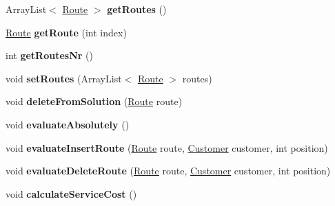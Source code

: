 \begin{DoxyCompactItemize}
\item 
Array\+List$<$ \hyperlink{classsvrptw_1_1_route}{Route} $>$ {\bfseries get\+Routes} ()\hypertarget{classtabu_1_1_my_solution_a0d53ac6bd5d5acbff1c2fcec609fd5a6}{}\label{classtabu_1_1_my_solution_a0d53ac6bd5d5acbff1c2fcec609fd5a6}

\item 
\hyperlink{classsvrptw_1_1_route}{Route} {\bfseries get\+Route} (int index)\hypertarget{classtabu_1_1_my_solution_a8f78485a9b2422bd9f00bbd20f86a20c}{}\label{classtabu_1_1_my_solution_a8f78485a9b2422bd9f00bbd20f86a20c}

\item 
int {\bfseries get\+Routes\+Nr} ()\hypertarget{classtabu_1_1_my_solution_a0c0a2401903315916b8db0d7baeed128}{}\label{classtabu_1_1_my_solution_a0c0a2401903315916b8db0d7baeed128}

\item 
void {\bfseries set\+Routes} (Array\+List$<$ \hyperlink{classsvrptw_1_1_route}{Route} $>$ routes)\hypertarget{classtabu_1_1_my_solution_a30cbab93efd82aa222a23b1bc3b0bb46}{}\label{classtabu_1_1_my_solution_a30cbab93efd82aa222a23b1bc3b0bb46}

\item 
void {\bfseries delete\+From\+Solution} (\hyperlink{classsvrptw_1_1_route}{Route} route)\hypertarget{classtabu_1_1_my_solution_a67ae75ddf98d5442f1a9168b761ef4e6}{}\label{classtabu_1_1_my_solution_a67ae75ddf98d5442f1a9168b761ef4e6}

\item 
void {\bfseries evaluate\+Absolutely} ()\hypertarget{classtabu_1_1_my_solution_a4cb6ce84091aeca2f5abd2b3bd3a3a17}{}\label{classtabu_1_1_my_solution_a4cb6ce84091aeca2f5abd2b3bd3a3a17}

\item 
void {\bfseries evaluate\+Insert\+Route} (\hyperlink{classsvrptw_1_1_route}{Route} route, \hyperlink{classsvrptw_1_1_customer}{Customer} customer, int position)\hypertarget{classtabu_1_1_my_solution_afb349f562af3c090e9853c5750b9232f}{}\label{classtabu_1_1_my_solution_afb349f562af3c090e9853c5750b9232f}

\item 
void {\bfseries evaluate\+Delete\+Route} (\hyperlink{classsvrptw_1_1_route}{Route} route, \hyperlink{classsvrptw_1_1_customer}{Customer} customer, int position)\hypertarget{classtabu_1_1_my_solution_a9fb2b2d21181d9855f976fcb0b37efa1}{}\label{classtabu_1_1_my_solution_a9fb2b2d21181d9855f976fcb0b37efa1}

\item 
void {\bfseries calculate\+Service\+Cost} ()\hypertarget{classtabu_1_1_my_solution_a39e67f49ed359aa7bdafea1062c1c15f}{}\label{classtabu_1_1_my_solution_a39e67f49ed359aa7bdafea1062c1c15f}


\end{DoxyCompactItemize}
